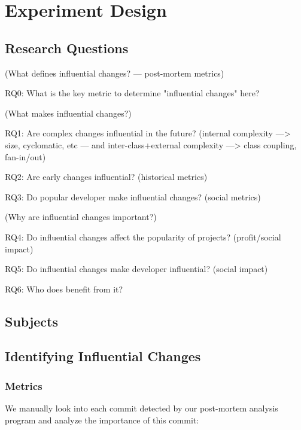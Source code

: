 \section{Experiment Design}
\label{sec:experiment}

\subsection{Research Questions}
\label{sec:questions}

(What defines influential changes? --- post-mortem metrics)

RQ0: What is the key metric to determine "influential changes" here?

(What makes influential changes?)

RQ1: Are complex changes influential in the future? (internal complexity 
---> size, cyclomatic, etc --- and inter-class+external complexity ---> class coupling, fan-in/out)

RQ2: Are early changes influential? (historical metrics)

RQ3: Do popular developer make influential changes? (social metrics)

(Why are influential changes important?)

RQ4: Do influential changes affect the popularity of projects? (profit/social impact)

RQ5: Do influential changes make developer influential? (social impact)

RQ6: Who does benefit from it?






\subsection{Subjects}




\subsection{Identifying Influential Changes}

\subsubsection{Metrics}
\label{sec:metrics}
We manually look into each commit detected by our post-mortem analysis program
and analyze the importance of this commit:

